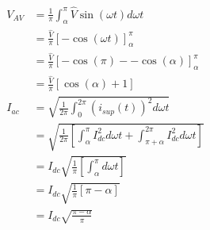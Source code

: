 \subsection{}

\begin{align*}
V_{AV} & = \frac{1}{\pi} \int_\alpha^\pi \hat{V} \sin(\omega t) d \omega t \\
       & = \frac{\hat{V}}{\pi} \left[ -\cos(\omega t)\right]_\alpha^\pi \\
       & = \frac{\hat{V}}{\pi} \left[-\cos(\pi)- -\cos(\alpha)\right]_\alpha^\pi \\
       & = \frac{\hat{V}}{\pi} \left[\cos(\alpha) + 1 \right] \\
I_{ac} & = \sqrt{\frac{1}{2\pi} \int_0^{2\pi} \left(i_{sup}(t)\right)^2 d \omega t} \\
      & = \sqrt{\frac{1}{2\pi} \left[ \int_\alpha^\pi I_{dc}^2 d \omega t  +  \int_{\pi+\alpha}^{2\pi} I_{dc}^2 d \omega t \right] }\\
      & = I_{dc} \sqrt{\frac{1}{\pi} \left[ \int_\alpha^\pi d \omega t  \right]} \\
      & = I_{dc} \sqrt{\frac{1}{\pi} \left[ \pi - \alpha \right]} \\
      & = I_{dc} \sqrt{\frac{\pi-\alpha}{\pi}}\\
\end{align*}